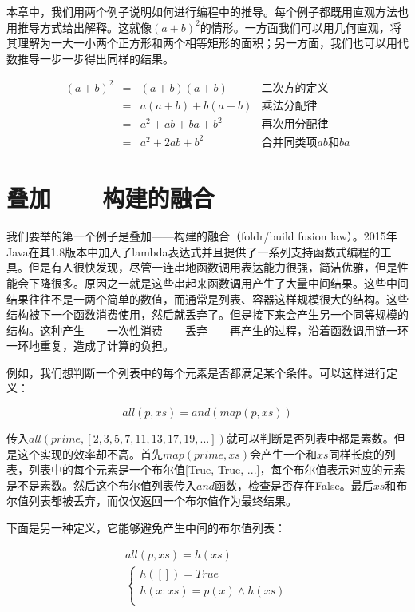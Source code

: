 \documentclass[b5paper]{ctexart}
\begin{document}
本章中，我们用两个例子说明如何进行编程中的推导。每个例子都既用直观方法也用推导方式给出解释。这就像$(a+b)^2$的情形。一方面我们可以用几何直观，将其理解为一大一小两个正方形和两个相等矩形的面积；另一方面，我们也可以用代数推导一步一步得出同样的结果。

\[
\begin{array}{rcll}
(a + b)^2 & = & (a + b)(a + b) & \text{二次方的定义} \\
          & = & a(a + b) + b(a + b) & \text{乘法分配律} \\
          & = & a^2 + ab + ba + b^2 & \text{再次用分配律} \\
          & = & a^2 + 2ab + b^2 & \text{合并同类项$ab$和$ba$}
\end{array}
\]

\section{叠加——构建的融合}

我们要举的第一个例子是叠加——构建的融合（foldr/build fusion law）。2015年Java在其1.8版本中加入了lambda表达式并且提供了一系列支持函数式编程的工具。但是有人很快发现，尽管一连串地函数调用表达能力很强，简洁优雅，但是性能会下降很多。原因之一就是这些串起来函数调用产生了大量中间结果。这些中间结果往往不是一两个简单的数值，而通常是列表、容器这样规模很大的结构。这些结构被下一个函数消费使用，然后就丢弃了。但是接下来会产生另一个同等规模的结构。这种产生——一次性消费——丢弃——再产生的过程，沿着函数调用链一环一环地重复，造成了计算的负担。

例如\cite{GLPJ-1993}，我们想判断一个列表中的每个元素是否都满足某个条件。可以这样进行定义：

\[
all(p, xs) = and(map(p, xs))
\]

传入$all(prime, [2, 3, 5, 7, 11, 13, 17, 19, ...])$就可以判断是否列表中都是素数。但是这个实现的效率却不高。首先$map(prime, xs)$会产生一个和$xs$同样长度的列表，列表中的每个元素是一个布尔值[True, True, ...]，每个布尔值表示对应的元素是不是素数。然后这个布尔值列表传入$and$函数，检查是否存在False。最后$xs$和布尔值列表都被丢弃，而仅仅返回一个布尔值作为最终结果。

下面是另一种定义，它能够避免产生中间的布尔值列表：

\[
\begin{array}{l}
all(p, xs) = h(xs) \\
  \begin{cases}
  h([]) = True \\
  h(x:xs) = p(x) \land h(xs) \\
  \end{cases}
\end{array}
\]
\end{document}
